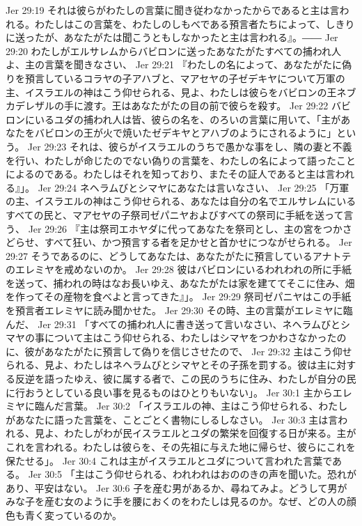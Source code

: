 Jer 29:19  それは彼らがわたしの言葉に聞き従わなかったからであると主は言われる。わたしはこの言葉を、わたしのしもべである預言者たちによって、しきりに送ったが、あなたがたは聞こうともしなかったと主は言われる』。――
Jer 29:20  わたしがエルサレムからバビロンに送ったあなたがたすべての捕われ人よ、主の言葉を聞きなさい、
Jer 29:21  『わたしの名によって、あなたがたに偽りを預言しているコラヤの子アハブと、マアセヤの子ゼデキヤについて万軍の主、イスラエルの神はこう仰せられる、見よ、わたしは彼らをバビロンの王ネブカデレザルの手に渡す。王はあなたがたの目の前で彼らを殺す。
Jer 29:22  バビロンにいるユダの捕われ人は皆、彼らの名を、のろいの言葉に用いて、「主があなたをバビロンの王が火で焼いたゼデキヤとアハブのようにされるように」という。
Jer 29:23  それは、彼らがイスラエルのうちで愚かな事をし、隣の妻と不義を行い、わたしが命じたのでない偽りの言葉を、わたしの名によって語ったことによるのである。わたしはそれを知っており、またその証人であると主は言われる』」。
Jer 29:24  ネヘラムびとシマヤにあなたは言いなさい、
Jer 29:25  「万軍の主、イスラエルの神はこう仰せられる、あなたは自分の名でエルサレムにいるすべての民と、マアセヤの子祭司ゼパニヤおよびすべての祭司に手紙を送って言う、
Jer 29:26  『主は祭司エホヤダに代ってあなたを祭司とし、主の宮をつかさどらせ、すべて狂い、かつ預言する者を足かせと首かせにつながせられる。
Jer 29:27  そうであるのに、どうしてあなたは、あなたがたに預言しているアナトテのエレミヤを戒めないのか。
Jer 29:28  彼はバビロンにいるわれわれの所に手紙を送って、捕われの時はなお長いゆえ、あなたがたは家を建ててそこに住み、畑を作ってその産物を食べよと言ってきた』」。
Jer 29:29  祭司ゼパニヤはこの手紙を預言者エレミヤに読み聞かせた。
Jer 29:30  その時、主の言葉がエレミヤに臨んだ、
Jer 29:31  「すべての捕われ人に書き送って言いなさい、ネヘラムびとシマヤの事について主はこう仰せられる、わたしはシマヤをつかわさなかったのに、彼があなたがたに預言して偽りを信じさせたので、
Jer 29:32  主はこう仰せられる、見よ、わたしはネヘラムびとシマヤとその子孫を罰する。彼は主に対する反逆を語ったゆえ、彼に属する者で、この民のうちに住み、わたしが自分の民に行おうとしている良い事を見るものはひとりもいない」。
Jer 30:1  主からエレミヤに臨んだ言葉。
Jer 30:2  「イスラエルの神、主はこう仰せられる、わたしがあなたに語った言葉を、ことごとく書物にしるしなさい。
Jer 30:3  主は言われる、見よ、わたしがわが民イスラエルとユダの繁栄を回復する日が来る。主がこれを言われる。わたしは彼らを、その先祖に与えた地に帰らせ、彼らにこれを保たせる」。
Jer 30:4  これは主がイスラエルとユダについて言われた言葉である。
Jer 30:5  「主はこう仰せられる、われわれはおののきの声を聞いた。恐れがあり、平安はない。
Jer 30:6  子を産む男があるか、尋ねてみよ。どうして男がみな子を産む女のように手を腰におくのをわたしは見るのか。なぜ、どの人の顔色も青く変っているのか。
